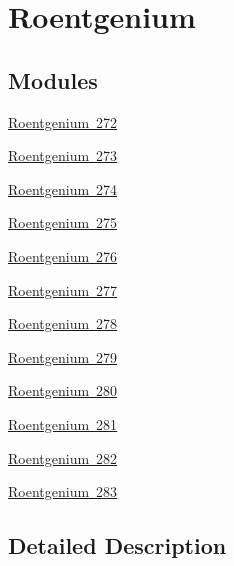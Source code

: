 \hypertarget{group___isotope_const-_roentgenium}{}\section{Roentgenium}
\label{group___isotope_const-_roentgenium}
\subsection*{Modules}
\begin{DoxyCompactItemize}
\item 
\mbox{\hyperlink{group___isotope_const-_roentgenium-_rg272}{Roentgenium 272}}
\item 
\mbox{\hyperlink{group___isotope_const-_roentgenium-_rg273}{Roentgenium 273}}
\item 
\mbox{\hyperlink{group___isotope_const-_roentgenium-_rg274}{Roentgenium 274}}
\item 
\mbox{\hyperlink{group___isotope_const-_roentgenium-_rg275}{Roentgenium 275}}
\item 
\mbox{\hyperlink{group___isotope_const-_roentgenium-_rg276}{Roentgenium 276}}
\item 
\mbox{\hyperlink{group___isotope_const-_roentgenium-_rg277}{Roentgenium 277}}
\item 
\mbox{\hyperlink{group___isotope_const-_roentgenium-_rg278}{Roentgenium 278}}
\item 
\mbox{\hyperlink{group___isotope_const-_roentgenium-_rg279}{Roentgenium 279}}
\item 
\mbox{\hyperlink{group___isotope_const-_roentgenium-_rg280}{Roentgenium 280}}
\item 
\mbox{\hyperlink{group___isotope_const-_roentgenium-_rg281}{Roentgenium 281}}
\item 
\mbox{\hyperlink{group___isotope_const-_roentgenium-_rg282}{Roentgenium 282}}
\item 
\mbox{\hyperlink{group___isotope_const-_roentgenium-_rg283}{Roentgenium 283}}
\end{DoxyCompactItemize}


\subsection{Detailed Description}
